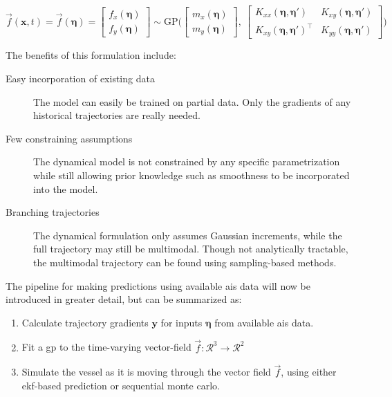 \begin{equation}\label{eq:gp_vec_field}
    \vec{f}(\boldsymbol{x}, t) = \vec{f}(\boldsymbol{\eta}) = \begin{bmatrix} f_x (\boldsymbol{\eta})\\ f_y (\boldsymbol{\eta})\end{bmatrix} \sim \text{GP} \big(\begin{bmatrix} m_x(\boldsymbol{\eta})\\m_y(\boldsymbol{\eta})\end{bmatrix}, \ \begin{bmatrix}
            K_{xx}(\boldsymbol{\eta}, \boldsymbol{\eta}') & K_{xy}(\boldsymbol{\eta}, \boldsymbol{\eta}') \\ K_{xy}(\boldsymbol{\eta}, \boldsymbol{\eta}')^\intercal & K_{yy}(\boldsymbol{\eta}, \boldsymbol{\eta}')
        \end{bmatrix}\big)
\end{equation}

The benefits of this formulation include:
\begin{description}
    \item[Easy incorporation of existing data] The model can easily be trained on partial data. Only the gradients of any historical trajectories are really needed.
    \item[Few constraining assumptions] The dynamical model is not constrained by any specific parametrization while still allowing prior knowledge such as smoothness to be incorporated into the model.
    \item[Branching trajectories] The dynamical formulation only assumes Gaussian increments, while the full trajectory may still be multimodal. Though not analytically tractable, the multimodal trajectory can be found using sampling-based methods.
\end{description}

The pipeline for making predictions using available \acrshort{ais} data will now be introduced in greater detail, but can be summarized as:
\begin{enumerate}
    \item Calculate trajectory gradients $\boldsymbol{y}$ for inputs $\boldsymbol{\eta}$ from available \acrshort{ais} data.
    \item Fit a \acrshort{gp} to the time-varying vector-field $\vec{f}: \mathcal{R}^3 \to \mathcal{R}^2$ 
    \item Simulate the vessel as it is moving through the vector field $\vec{f}$, using either \acrshort{ekf}-based prediction or sequential monte carlo.
\end{enumerate}

